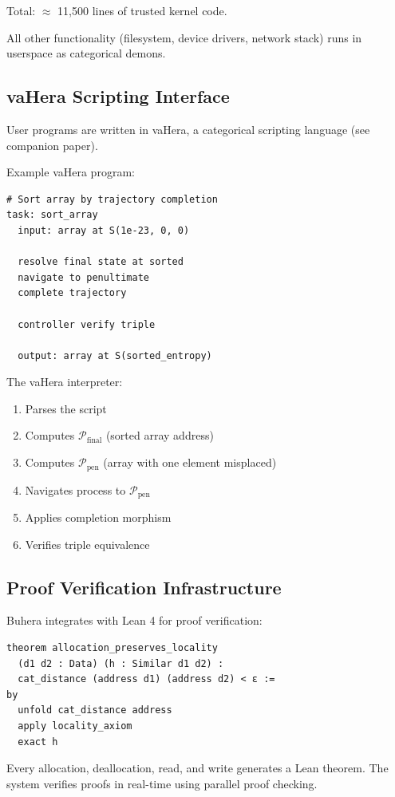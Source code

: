 \documentclass[twocolumn,10pt]{article}
\theoremstyle{definition}
\theoremstyle{remark}
\newcommand{\pentstate}{\mathcal{P}_{\text{pen}}}
\newcommand{\finalstate}{\mathcal{P}_{\text{final}}}
\begin{document}
Total: $\approx$ 11,500 lines of trusted kernel code.

All other functionality (filesystem, device drivers, network stack) runs in userspace as categorical demons.

\subsection{vaHera Scripting Interface}

User programs are written in vaHera, a categorical scripting language (see companion paper).

Example vaHera program:
\begin{verbatim}
# Sort array by trajectory completion
task: sort_array
  input: array at S(1e-23, 0, 0)

  resolve final state at sorted
  navigate to penultimate
  complete trajectory

  controller verify triple

  output: array at S(sorted_entropy)
\end{verbatim}

The vaHera interpreter:
\begin{enumerate}
    \item Parses the script
    \item Computes $\finalstate$ (sorted array address)
    \item Computes $\pentstate$ (array with one element misplaced)
    \item Navigates process to $\pentstate$
    \item Applies completion morphism
    \item Verifies triple equivalence
\end{enumerate}

\subsection{Proof Verification Infrastructure}

Buhera integrates with Lean 4 for proof verification:

\begin{verbatim}
theorem allocation_preserves_locality
  (d1 d2 : Data) (h : Similar d1 d2) :
  cat_distance (address d1) (address d2) < ε :=
by
  unfold cat_distance address
  apply locality_axiom
  exact h
\end{verbatim}

Every allocation, deallocation, read, and write generates a Lean theorem. The system verifies proofs in real-time using parallel proof checking.
\end{document}
